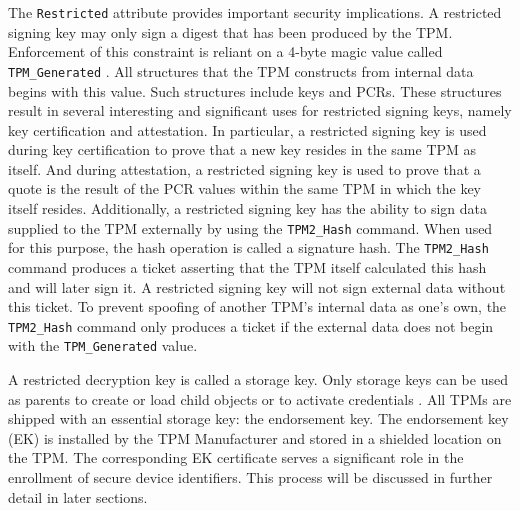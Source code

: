 The \verb|Restricted| attribute provides important security implications. A restricted signing key may only sign a digest that has been produced by the TPM. Enforcement of this constraint is reliant on a 4-byte magic value called \verb|TPM_Generated| \cite{TPMSpec}. All structures that the TPM constructs from internal data begins with this value. Such structures include keys and PCRs. These structures result in several interesting and significant uses for restricted signing keys, namely key certification and attestation. In particular, a restricted signing key is used during key certification to prove that a new key resides in the same TPM as itself. And during attestation, a restricted signing key is used to prove that a quote is the result of the PCR values within the same TPM in which the key itself resides. Additionally, a restricted signing key has the ability to sign data supplied to the TPM externally by using the \verb|TPM2_Hash| command. When used for this purpose, the hash operation is called a signature hash. The \verb|TPM2_Hash| command produces a ticket asserting that the TPM itself calculated this hash and will later sign it. A restricted signing key will not sign external data without this ticket. To prevent spoofing of another TPM's internal data as one's own, the \verb|TPM2_Hash| command only produces a ticket if the external data does not begin with the \verb|TPM_Generated| value.


A restricted decryption key is called a storage key. Only storage keys can be used as parents to create or load child objects or to activate credentials \cite{PracticalGuide}. All TPMs are shipped with an essential storage key: the endorsement key. The endorsement key (EK) is installed by the TPM Manufacturer and stored in a shielded location on the TPM. The corresponding EK certificate serves a significant role in the enrollment of secure device identifiers. This process will be discussed in further detail in later sections.

